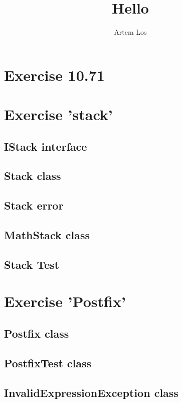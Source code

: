 \documentclass[10pt,a4paper]{article}
\author{Artem Los}
\title{Hello}
\begin{document}
\section*{Exercise 10.71}


\section*{Exercise 'stack'}
\subsection*{IStack interface}

\subsection*{Stack class}

\subsection*{Stack error}

\subsection*{MathStack class}

\subsection*{Stack Test}


\section*{Exercise 'Postfix'}
\subsection*{Postfix class}

\subsection*{PostfixTest class}

\subsection*{InvalidExpressionException class}

\end{document}
